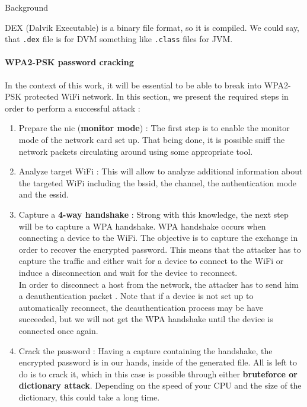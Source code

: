 \begin{chaptercover}{Background}
\begin{indentbox}{1cm}
DEX (Dalvik Executable) is a binary file format, so it is compiled. We could say, that \texttt{.dex} file is for DVM something like \texttt{.class} files for JVM.
\end{indentbox}

\paragraph{WPA2-PSK password cracking} In the context of this work, it will be essential to be able to break into WPA2-PSK protected WiFi network. In this section, we present the required steps in order to perform a successful attack :
\begin{enumerate}
  \item Prepare the \acrshort{nic} (\textbf{monitor mode}) : The first step is to enable the monitor mode of the network card set up. That being done, it is possible sniff the network packets circulating around using some appropriate tool.
  \item Analyze target WiFi : This will allow to analyze additional information about the targeted WiFi including the \acrshort{bssid}, the channel, the authentication mode and the \acrshort{essid}.
  \item Capture a \textbf{4-way handshake} : Strong with this knowledge, the next step will be to capture a WPA handshake. WPA handshake occurs when connecting a device to the WiFi. The objective is to capture the exchange in order to recover the encrypted password. This means that the attacker has to capture the traffic and either wait for a device to connect to the WiFi or induce a disconnection and wait for the device to reconnect. \newline \\
  In order to disconnect a host from the network, the attacker has to send him a deauthentication packet \cite{deauthentication}. Note that if a device is not set up to automatically reconnect, the deauthentication process may be have succeeded, but we will not get the WPA handshake until the device is connected once again.
  \item Crack the password : Having a capture containing the handshake, the encrypted password is in our hands, inside of the generated file. All is left to do is to crack it, which in this case is possible through either \textbf{bruteforce or dictionary attack}. Depending on the speed of your CPU and the size of the dictionary, this could take a long time.
\end{enumerate}


\end{chaptercover}
